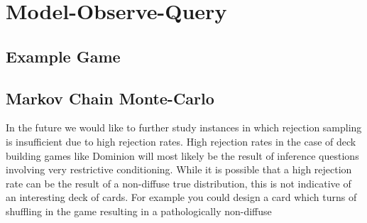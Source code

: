 
\section{Model-Observe-Query} \label{sec:moq}

\subsection{Example Game}

\subsection{Markov Chain Monte-Carlo} \label{sec:mcmc}


In the future we would like to further study instances in which rejection
sampling is insufficient due to high rejection rates. High rejection rates
in the case of deck building games like Dominion will most likely be the
result of inference questions involving very restrictive conditioning.
While it is possible that a high rejection rate can be the result of
a non-diffuse true distribution, this is not indicative of an interesting
deck of cards. For example you could design a card which turns
of shuffling in the game resulting in a pathologically non-diffuse 


